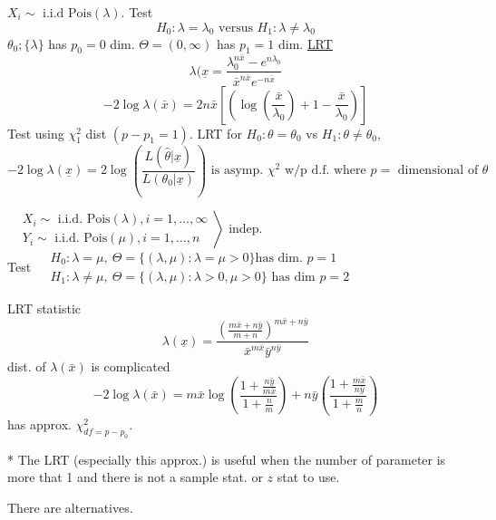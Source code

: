 \documentclass[english, 11pt]{article}
\newcommand{\lp}{\left(}
\newcommand{\rp}{\right)}
\begin{document}
\begin{exmp}
$X_i\sim \text{ i.i.d Pois}(\lambda)$. Test
$$
H_0:\lambda=\lambda_0\text{  versus  }H_1:\lambda\not=\lambda_0
$$
$\theta_0;\{\lambda\}$ has $p_0=0$ dim. $\Theta=(0, \infty)$ has $p_1=1$ dim. \underline{LRT}
$$
\lambda(\underline{x}=\frac{\lambda_0^{n\bar{x}}-e^{n\lambda_0}}{\bar{x}^{n\bar{x}}e^{-n\bar{x}}}
$$
$$
-2\log\lambda(\bar{x})=2n\bar{x}\left[\lp\log\lp\frac{\bar{x}}{\lambda_0}\rp+1-\frac{\bar{x}}{\lambda_0}\rp\right]
$$
Test using $\chi^2_1$ dist $(p-p_1=1)$. LRT for $H_0:\theta=\theta_0$ vs $H_1:\theta\not=\theta_0$,
$$
-2\log\lambda(\underline{x})=2\log\lp\frac{L(\hat{\theta}|\underline{x})}{L(\theta_0|\underline{x})}\rp\text{ is asymp. }\chi^2\text{ w/p d.f. where }p=\text{ dimensional of }\theta
$$
\end{exmp}

\begin{exmp}
$\left.\begin{aligned}
&X_i\sim\text{ i.i.d. Pois}(\lambda), i=1, \dots, \infty\\
&Y_i\sim\text{ i.i.d. Pois}(\mu), i=1, \dots, n
\end{aligned}\right\rangle$ indep.\\
Test $\begin{aligned}
&H_0:\lambda=\mu, ~\Theta=\{(\lambda, \mu):\lambda=\mu>0\}\text{has dim. }p=1\\
&H_1:\lambda\not=\mu, ~\Theta=\{(\lambda, \mu):\lambda>0, \mu>0\}\text{ has dim }p=2
\end{aligned}$

LRT statistic
$$
\lambda(\underline{x})=\frac{\lp\frac{m\bar{x}+n\bar{y}}{m+n}\rp^{m\bar{x}+n\bar{y}}}{\bar{x}^{m\bar{x}}\bar{y}^{n\bar{y}}}
$$
dist. of $\lambda(\bar{x})$ is complicated
$$
-2\log\lambda(\bar{x})=m\bar{x}\log\lp\frac{1+\frac{n\bar{y}}{m\bar{x}}}{1+\frac{n}{m}}\rp+n\bar{y}\lp\frac{1+\frac{m\bar{x}}{n\bar{y}}}{1+\frac{m}{n}}\rp
$$
has approx. $\chi^2_{df=p-p_0}$.

* The LRT (especially this approx.) is useful when the number of parameter is more that 1 and there is not a sample stat. or $z$ stat to use.

There are alternatives.
\end{exmp}
\end{document}
